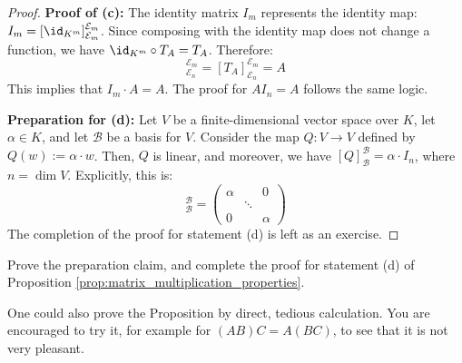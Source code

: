 \begin{proof}
\textbf{Proof of (c):} The identity matrix $I_m$ represents the identity map: $I_m = [\id_{K^m}]_{\mathcal{E}_m}^{\mathcal{E}_m}$. Since composing with the identity map does not change a function, we have $\id_{K^m} \circ T_A = T_A$. Therefore:
\begin{equation*}
    [\id_{K^m} \circ T_A]_{\mathcal{E}_n}^{\mathcal{E}_m} = [T_A]_{\mathcal{E}_n}^{\mathcal{E}_m} = A
\end{equation*}
This implies that $I_m \cdot A = A$. The proof for $A I_n = A$ follows the same logic.

\textbf{Preparation for (d):} Let $V$ be a finite-dimensional vector space over $K$, let $\alpha \in K$, and let $\mathcal{B}$ be a basis for $V$. Consider the map $Q: V \to V$ defined by $Q(w) := \alpha \cdot w$. Then, $Q$ is linear, and moreover, we have $[Q]_{\mathcal{B}}^{\mathcal{B}} = \alpha \cdot I_n$, where $n = \dim V$. Explicitly, this is:
\begin{equation*}
    [Q]_{\mathcal{B}}^{\mathcal{B}} = \begin{pmatrix} \alpha & & 0 \\ & \ddots & \\ 0 & & \alpha \end{pmatrix}
\end{equation*}
The completion of the proof for statement (d) is left as an exercise.
\end{proof}

\begin{exercise}
Prove the preparation claim, and complete the proof for statement (d) of Proposition \ref{prop:matrix_multiplication_properties}.
\end{exercise}

\begin{remark}
One could also prove the Proposition by direct, tedious calculation. You are encouraged to try it, for example for $(AB)C = A(BC)$, to see that it is not very pleasant.
\end{remark}


